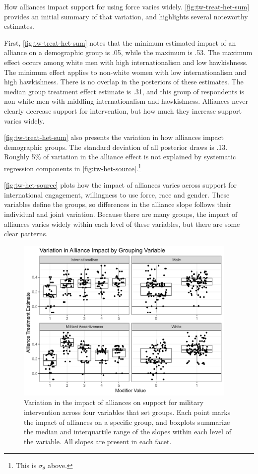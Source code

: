 \documentclass[12pt]{article}
\begin{document}
How alliances impact support for using force varies widely. 
\autoref{fig:tw-treat-het-sum} provides an initial summary of that variation, and highlights several noteworthy estimates. 


First, \autoref{fig:tw-treat-het-sum} notes that the minimum estimated impact of an alliance on a demographic group is .05, while the maximum is .53. 
The maximum effect occurs among white men with high internationalism and low hawkishness.
The minimum effect applies to non-white women with low internationalism and high hawkishness. 
There is no overlap in the posteriors of these estimates. 
The median group treatment effect estimate is .31, and this group of respondents is non-white men with middling internationalism and hawkishness. 
Alliances never clearly decrease support for intervention, but how much they increase support varies widely. 


\autoref{fig:tw-treat-het-sum} also presents the variation in how alliances impact demographic groups.
The standard deviation of all posterior draws is .13. 
Roughly 5\% of variation in the alliance effect is not explained by systematic regression components in \autoref{fig:tw-het-source}.\footnote{This is $\sigma_\theta$ above.}


\autoref{fig:tw-het-source} plots how the impact of alliances varies across support for international engagement, willingness to use force, race and gender. 
These variables define the groups, so differences in the alliance slope follows their individual and joint variation. 
Because there are many groups, the impact of alliances varies widely within each level of these variables, but there are some clear patterns. 


\begin{figure}[htpb]
	\centering
		\includegraphics[width=0.95\textwidth]{../figures/tw-het-source.png}
	\caption{Variation in the impact of alliances on support for military intervention across four variables that set groups. Each point marks the impact of alliances on a specific group, and boxplots summarize the median and interquartile range of the slopes within each level of the variable. All slopes are present in each facet.}
	\label{fig:tw-het-source}
\end{figure}
\end{document}
